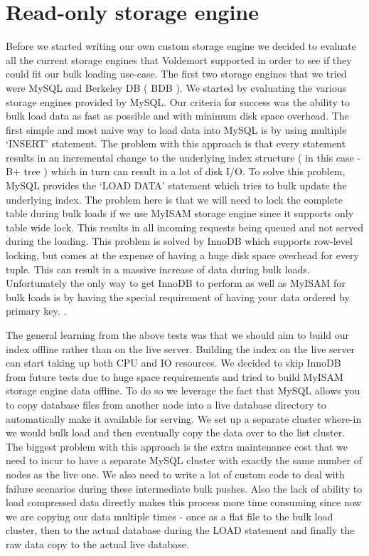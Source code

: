 \documentclass[10pt,twocolumn,preprint,natbib,authoryear]{sigplanconf}
\begin{document}

\section{Read-only storage engine}
\label{sec:read_only}

Before we started writing our own custom storage engine we decided to evaluate all the current storage engines that Voldemort supported in order to see if they could fit our bulk loading use-case. The first two storage engines that we tried were MySQL and Berkeley DB ( BDB ). We started by evaluating the various storage engines provided by MySQL. Our criteria for success was the ability to bulk load data as fast as possible and with minimum disk space overhead. The first simple and most naive way to load data into MySQL is by using multiple `INSERT' statement. The problem with this approach is that every statement results in an incremental change to the underlying index structure ( in this case - B+ tree ) which in turn can result in a lot of disk I/O. To solve this problem, MySQL provides the `LOAD DATA' statement which tries to bulk update the underlying index. The problem here is that we will need to lock the complete table during bulk loads if we use MyISAM storage engine since it supports only table wide lock. This results in all incoming requests being queued and not served during the loading. This problem is solved by InnoDB which supports row-level locking, but comes at the expense of having a huge disk space overhead for every tuple. This can result in a massive increase of data during bulk loads. Unfortunately the only way to get InnoDB to perform as well as MyISAM for bulk loads is by having the special requirement of having your data ordered by primary key.  \cite{http://blogs.oracle.com/carriergrademysql/entry/tips_for_bulk_loading}. 

The general learning from the above tests was that we should aim to build our index offline rather than on the live server. Building the index on the live server can start taking up both CPU and IO resources. We decided to skip InnoDB from future tests due to huge space requirements and tried to build MyISAM storage engine data offline. To do so we leverage the fact that MySQL allows you to copy database files from another node into a live database directory to automatically make it available for serving. We set up a separate cluster where-in we would bulk load and then eventually copy the data over to the list cluster. The biggest problem with this approach is the extra maintenance cost that we need to incur to have a separate MySQL cluster with exactly the same number of nodes as the live one. We also need to write a lot of custom code to deal with failure scenarios during these intermediate bulk pushes. Also the lack of ability to load compressed data directly makes this process more time consuming since now we are copying our data multiple times - once as a flat file to the bulk load cluster, then to the actual database during the LOAD statement and finally the raw data copy to the actual live database. 
\end{document}
